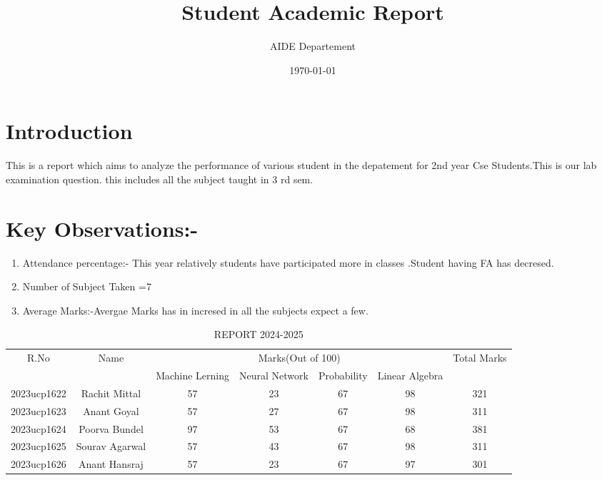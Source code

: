 \documentclass{article}
\title{\textbf{Student Academic Report}}
\author{AIDE Departement}
\date{\today}
\begin{document}
\maketitle

\section{Introduction}
This is a report which aims to analyze the performance of various student in the depatement for 2nd year Cse Students.This is our lab examination question.
this includes all the subject taught in 3 rd sem.
\section{Key Observations:-}
\begin{enumerate}
    \item Attendance percentage:- This year relatively students have participated more in classes .Student having FA has decresed.\\
    \item Number of Subject Taken =7\\
    \item Average Marks:-Avergae Marks has in incresed in all the subjects expect a few. 
\end{enumerate}
\begin{table}[]
    \centering
    \begin{tabular}{|c|c|c|c|c|c|c|}
    \hline
         R.No & Name & \multicolumn{4}{|c|}{Marks(Out of 100)} & Total Marks\\
         \cline{3-6}
               &      & Machine Lerning & Neural Network & Probability &Linear Algebra& \\
        \hline
        2023ucp1622 & Rachit Mittal & 57 & 23 & 67 & 98 & 321\\
        \hline
        2023ucp1623 & Anant Goyal & 57 & 27 & 67 & 98 & 311\\
        \hline
        2023ucp1624 & Poorva Bundel & 97 & 53 & 67 & 68 & 381\\
        \hline
        2023ucp1625 & Sourav Agarwal & 57 & 43 & 67 & 98 & 311\\
        \hline
        2023ucp1626 & Anant Hansraj & 57 & 23 & 67 & 97 & 301\\
        \hline
         
    \end{tabular}
    \caption{REPORT 2024-2025}

\end{table}
\end{document}
